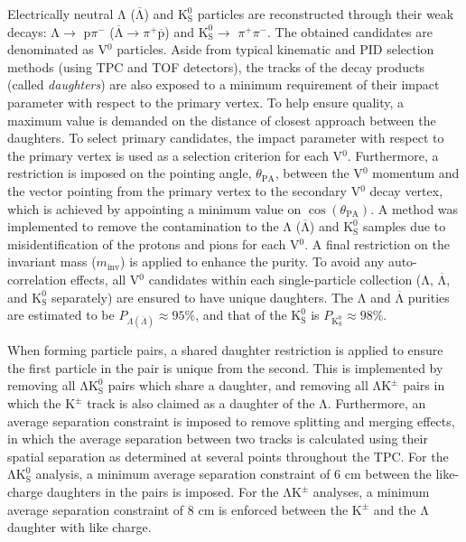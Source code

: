 \documentclass{svproc}
\newcommand{\minv}{$m_{\mathrm{inv}}$\xspace}
\newcommand{\Lam}{$\mathrm{\Lambda}$\xspace}
\newcommand{\ALam}{$\overline{\mathrm{\Lambda}}$\xspace}
\newcommand{\LamALam}{$\mathrm{\Lambda}$ ($\overline{\mathrm{\Lambda}}$)\xspace}
\newcommand{\Kpm}{$\mathrm{K^{\pm}}$\xspace}
\newcommand{\Ks}{$\mathrm{K^{0}_{S}}$\xspace}
\newcommand{\LamKpm}{$\mathrm{\Lambda}\mathrm{K^{\pm}}$\xspace}
\newcommand{\LamKs}{$\mathrm{\Lambda}\mathrm{K^{0}_{S}}$\xspace}
\newcommand{\Vz}{V$^{0}$\xspace}
\begin{document}

Electrically neutral \LamALam and \Ks particles are reconstructed through their weak decays: \Lam $\rightarrow$ p$\pi^{-}$ (\ALam $\rightarrow \pi^{+}\overline{\mathrm{p}}$) and \Ks $\rightarrow$ $\pi^{+}\pi^{-}$.
The obtained candidates are denominated as \Vz particles.
Aside from typical kinematic and PID selection methods (using TPC and TOF detectors), the tracks of the decay products (called \textit{daughters}) are also exposed to a minimum requirement of their impact parameter with respect to the primary vertex.  
To help ensure quality, a maximum value is demanded on the distance of closest approach between the daughters.
To select primary candidates, the impact parameter with respect to the primary vertex is used as a selection criterion for each \Vz.
Furthermore, a restriction is imposed on the pointing angle, $\theta_{\mathrm{PA}}$, between the \Vz momentum and the vector pointing from the primary vertex to the secondary \Vz decay vertex, which is achieved by appointing a minimum value on $\cos(\theta_{\mathrm{PA}})$.
A method was implemented to remove the contamination to the \LamALam and \Ks samples due to misidentification of the protons and pions for each \Vz.
A final restriction on the invariant mass (\minv) is applied to enhance the purity.
To avoid any auto-correlation effects, all \Vz candidates within each single-particle collection (\Lam, \ALam, and \Ks separately) are ensured to have unique daughters. 
The \Lam and \ALam purities are estimated to be $P_{\Lambda(\overline{\Lambda})} \approx 95\%$, and that of the \Ks is $P_{\mathrm{K^{0}_{S}}} \approx 98\%$.



When forming particle pairs, a shared daughter restriction is applied to ensure the first particle in the pair is unique from the second. 
This is implemented by removing all \LamKs pairs which share a daughter, and removing all \LamKpm pairs in which the \Kpm track is also claimed as a daughter of the \Lam.
Furthermore, an average separation constraint is imposed to remove splitting and merging effects, in which the average separation between two tracks is calculated using their spatial separation as determined at several points throughout the TPC.
For the \LamKs analysis, a minimum average separation constraint of 6 cm between the like-charge daughters in the pairs is imposed.
For the \LamKpm analyses, a minimum average separation constraint of 8 cm is enforced between the \Kpm and the \Lam daughter with like charge.
\end{document}
